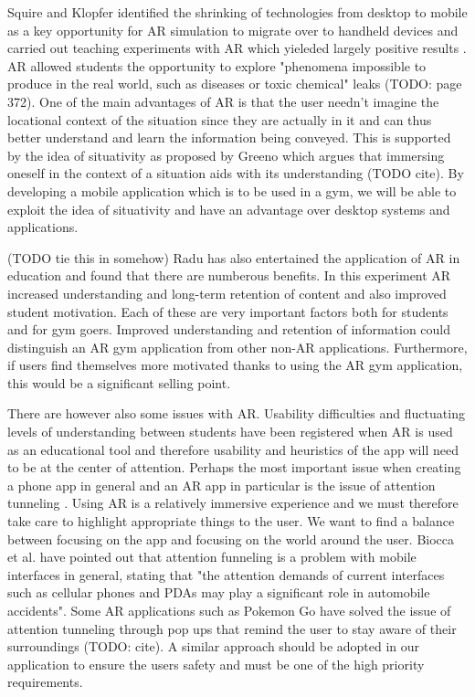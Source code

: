 \documentclass{l4proj}
\begin{document}
Squire and Klopfer identified the shrinking of technologies from desktop to mobile as a key opportunity for AR simulation to migrate over to handheld devices and carried out teaching experiments with AR which yieleded largely positive results \nocite{squire_augmented_2007}. AR allowed students the opportunity to explore "phenomena impossible to produce in the real world, such as diseases or toxic chemical" leaks \nocite{squire_augmented_2007} (TODO: page 372). One of the main advantages of AR is that the user needn't imagine the locational context of the situation since they are actually in it and can thus better understand and learn the information being conveyed. This is supported by the idea of situativity as proposed by Greeno which argues that immersing oneself in the context of a situation aids with its understanding (TODO cite). By developing a mobile application which is to be used in a gym, we will be able to exploit the idea of situativity and have an advantage over desktop systems and applications.

(TODO tie this in somehow)
Radu has also entertained the application of AR in education and found that there are numberous benefits\nocite{radu_why_2012}. In this experiment AR increased understanding and long-term retention of content and also improved student motivation\nocite{radu_why_2012}. Each of these are very important factors both for students and for gym goers. Improved understanding and retention of information could distinguish an AR gym application from other non-AR applications. Furthermore, if users find themselves more motivated thanks to using the AR gym application, this would be a significant selling point.

There are however also some issues with AR. Usability difficulties and fluctuating levels of understanding between students have been registered when AR is used as an educational tool \nocite{radu_why_2012} and therefore usability and heuristics of the app will need to be at the center of attention. Perhaps the most important issue when creating a phone app in general and an AR app in particular is the issue of attention tunneling \nocite{radu_why_2012} \nocite{biocca_attention_2007}. Using AR is a relatively immersive experience and we must therefore take care to highlight appropriate things to the user. We want to find a balance between focusing on the app and focusing on the world around the user. Biocca et al. have pointed out that attention funneling is a problem with mobile interfaces in general, stating that "the attention demands of current interfaces such as cellular phones and PDAs may play a significant role in automobile accidents". Some AR applications such as Pokemon Go have solved the issue of attention tunneling through pop ups that remind the user to stay aware of their surroundings (TODO: cite). A similar approach should be adopted in our application to ensure the users safety and must be one of the high priority requirements.
\end{document}
